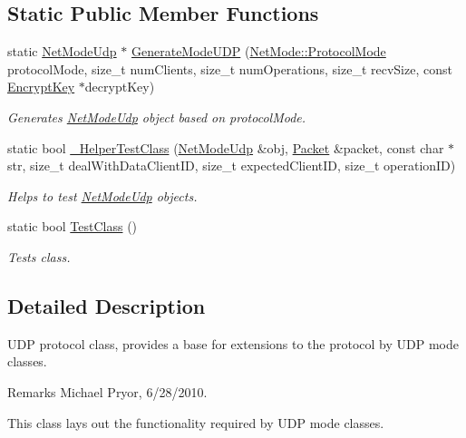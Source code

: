 \subsection*{Static Public Member Functions}
\begin{DoxyCompactItemize}
\item 
static \hyperlink{class_net_mode_udp}{NetModeUdp} $\ast$ \hyperlink{class_net_mode_udp_a1478e9a9a976cf276686c0136a1ba9da}{GenerateModeUDP} (\hyperlink{class_net_mode_a43cfa55ee6a4db66a8d7d6c27f766964}{NetMode::ProtocolMode} protocolMode, size\_\-t numClients, size\_\-t numOperations, size\_\-t recvSize, const \hyperlink{class_encrypt_key}{EncryptKey} $\ast$decryptKey)
\begin{DoxyCompactList}\small\item\em Generates \hyperlink{class_net_mode_udp}{NetModeUdp} object based on {\itshape protocolMode\/}. \item\end{DoxyCompactList}\item 
static bool \hyperlink{class_net_mode_udp_ab1fcbb4b7f8837cba08bfbdbcfe500e2}{\_\-HelperTestClass} (\hyperlink{class_net_mode_udp}{NetModeUdp} \&obj, \hyperlink{class_packet}{Packet} \&packet, const char $\ast$str, size\_\-t dealWithDataClientID, size\_\-t expectedClientID, size\_\-t operationID)
\begin{DoxyCompactList}\small\item\em Helps to test \hyperlink{class_net_mode_udp}{NetModeUdp} objects. \item\end{DoxyCompactList}\item 
static bool \hyperlink{class_net_mode_udp_a2d4e3b8aede50899cb756392c48a8bcd}{TestClass} ()
\begin{DoxyCompactList}\small\item\em Tests class. \item\end{DoxyCompactList}\end{DoxyCompactItemize}


\subsection{Detailed Description}
UDP protocol class, provides a base for extensions to the protocol by UDP mode classes. \begin{DoxyRemark}{Remarks}
Michael Pryor, 6/28/2010.
\end{DoxyRemark}
This class lays out the functionality required by UDP mode classes. 

